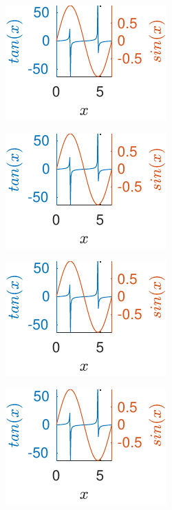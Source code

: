 	\begin{figure}[H]
		\centering
		\begin{subfigure}[b]{\fourfig\textwidth} 
			\includegraphics{../matlab/fig/examples/tansin-with-ffsp.pdf}
		\end{subfigure}
		\hfil
		\begin{subfigure}[b]{\fourfig\textwidth} 
			\includegraphics{../matlab/fig/examples/tansin-with-ffsp.pdf}
		\end{subfigure}
		\hfil
		\begin{subfigure}[b]{\fourfig\textwidth} 
			\includegraphics{../matlab/fig/examples/tansin-with-ffsp.pdf}
		\end{subfigure}
		\hfil
		\begin{subfigure}[b]{\fourfig\textwidth} 
			\includegraphics{../matlab/fig/examples/tansin-with-ffsp.pdf}

\end{subfigure}
\end{figure}
